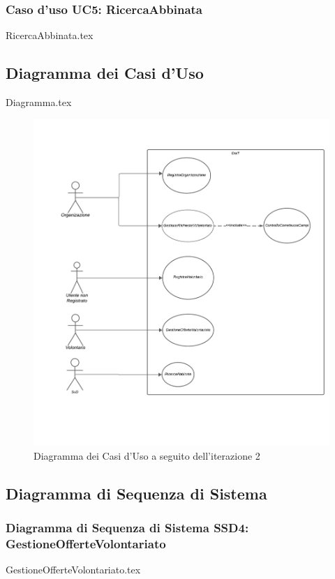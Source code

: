 \documentclass[12pt]{article}
\begin{document}
\subsubsection{Caso d'uso UC5: RicercaAbbinata}
{RicercaAbbinata.tex}

\subsection{Diagramma dei Casi d'Uso}
{Diagramma.tex}
\begin{figure}[H]
    \includegraphics[width=\textwidth,keepaspectratio]{Immagini/DiagrammaDeiCasiD'Uso/Iterazione 2/Diagramma.pdf}
        \caption{Diagramma dei Casi d'Uso a seguito dell'iterazione 2}
        \label{fig:diagrammaCasiUso2}
\end{figure}

\subsection{Diagramma di Sequenza di Sistema}
\subsubsection{Diagramma di Sequenza di Sistema SSD4: GestioneOfferteVolontariato}
{GestioneOfferteVolontariato.tex}
\end{document}
